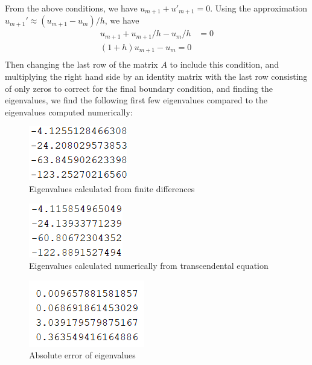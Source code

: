 \documentclass{article}
\begin{document}
\begin{enumerate}
    From the above conditions, we have $u_{m+1} + u'_{m+1} = 0$. Using the approximation $u_{m+1}' \approx (u_{m+1} - u_{m})/h$, we have
    \begin{align*}
        u_{m+1} + u_{m+1}/h - u_m/h &= 0 \\
        (1 + h)u_{m+1} - u_m = 0 \\
    \end{align*}
    Then changing the last row of the matrix $A$ to include this condition, and multiplying the right hand side by an identity matrix with the last row consisting of only zeros to correct for the final boundary condition, and finding the eigenvalues, we find the following first few eigenvalues compared to the eigenvalues computed numerically:
    
    \begin{figure}[!h]
        \begin{center}
            \includegraphics[]{eigapprox1b.PNG}
            \caption{Eigenvalues calculated from finite differences}
        \end{center}
    \end{figure}
    \begin{figure}[!h]
        \begin{center}
            \includegraphics[]{trueeig1b.PNG}
            \caption{Eigenvalues calculated numerically from transcendental equation}
        \end{center}
    \end{figure}
    \begin{figure}[!h]
        \begin{center}
            \includegraphics[]{err1b.PNG}
            \caption{Absolute error of eigenvalues}
        \end{center}
    \end{figure}
    

\end{enumerate}
\end{document}
